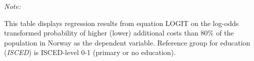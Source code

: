 \begin{table}[htbp!]
\begin{adjustbox}{width = 1\textwidth, max height = 0.95\textheight, center}
\begin{threeparttable}[b]
         \begin{tablenotes}\item \medskip \textit{Note:}
            \item This table displays regression results from equation LOGIT on the log-odds transformed probability of higher (lower) additional costs than 80\% of the population in Norway as the dependent variable. Reference group for education (\textit{ISCED}) is ISCED-level 0-1 (primary or no education).
         \end{tablenotes}
      \end{threeparttable}
   \end{adjustbox}
\end{table}


